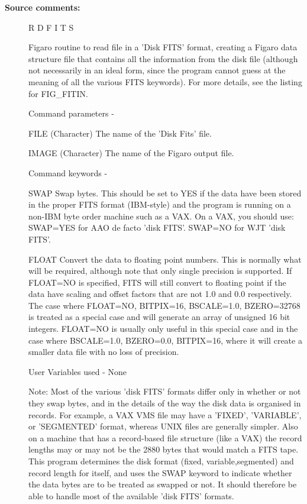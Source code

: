 \begin{description}
\begin{description}
\item [\textbf{Source comments:}]
\begin{terminalv}
 R D F I T S

 Figaro routine to read file in a 'Disk FITS' format,
 creating a Figaro data structure file that contains all
 the information from the disk file (although not necessarily in
 an ideal form, since the program cannot guess at the meaning
 of all the various FITS keywords).  For more details, see the
 listing for FIG_FITIN.

 Command parameters -

 FILE       (Character) The name of the 'Disk Fits' file.

 IMAGE      (Character) The name of the Figaro output file.

 Command keywords -

 SWAP       Swap bytes.  This should be set to YES if the data
            have been stored in the proper FITS format (IBM-style)
            and the program is running on a non-IBM byte order
            machine such as a VAX.  On a VAX, you should use:
            SWAP=YES for AAO de facto 'disk FITS'.
            SWAP=NO for WJT 'disk FITS'.

 FLOAT      Convert the data to floating point numbers. This is
            normally what will be required, although note that only
            single precision is supported.  If FLOAT=NO is specified,
            FITS will still convert to floating point if the data have
            scaling and offset factors that are not 1.0 and 0.0
            respectively.  The case where FLOAT=NO, BITPIX=16,
            BSCALE=1.0, BZERO=32768 is treated as a special case and
            will generate an array of unsigned 16 bit integers.
            FLOAT=NO is usually only useful in this special case and
            in the case where BSCALE=1.0, BZERO=0.0, BITPIX=16, where
            it will create a smaller data file with no loss of precision.

 User Variables used -   None

 Note:  Most of the various 'disk FITS' formats differ only in
        whether or not they swap bytes, and in the details of the
        way the disk data is organised in records.  For example,
        a VAX VMS file may have a 'FIXED', 'VARIABLE', or 'SEGMENTED'
        format, whereas UNIX files are generally simpler.  Also on
        a machine that has a record-based file structure (like a VAX)
        the record lengths may or may not be the 2880 bytes that would
        match a FITS tape. This program determines the disk format
        (fixed, variable,segmented) and record length for itself, and
        uses the SWAP keyword to indicate whether the data bytes are to
        be treated as swapped or not.  It should therefore be able to
        handle most of the available 'disk FITS' formats.


\end{terminalv}
\end{description}
\end{description}
